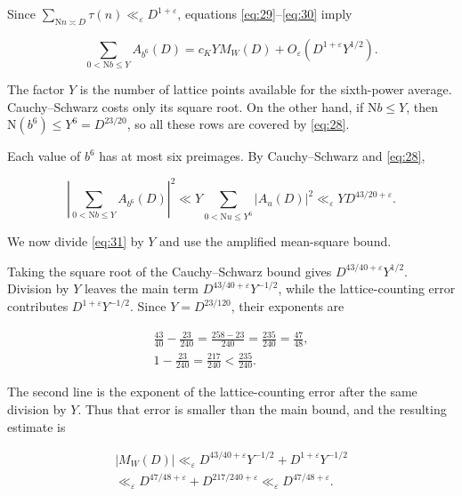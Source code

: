 \documentclass[reqno,a4paper,11pt]{amsart}
\begin{document}
Since $\sum _{\mathrm{N}n\asymp D} \tau \left( n\right) {\ll }_{\varepsilon }{D}^{1+\varepsilon }$, equations \eqref{eq:29}--\eqref{eq:30} imply

\begin{equation}\label{eq:31}
\sum _{0<\mathrm{N}b\le Y} {A}_{{b}^{6}}\left( D\right) ={c}_{K}Y{M}_{W}\left( D\right) +{O}_{\varepsilon }\left( {D}^{1+\varepsilon }{Y}^{1/2}\right) .
\end{equation}

The factor $Y$ is the number of lattice points available for the sixth-power average. Cauchy--Schwarz costs only its square root. On the other hand, if $\mathrm{N}b\le Y$, then $\mathrm{N}(b^6)\le Y^6=D^{23/20}$, so all these rows are covered by \eqref{eq:28}.

Each value of ${b}^{6}$ has at most six preimages. By Cauchy--Schwarz and \eqref{eq:28},

\[
{\left| \sum _{0<\mathrm{N}b\le Y} {A}_{{b}^{6}}\left( D\right) \right| }^{2}\ll Y\sum _{0<\mathrm{N}u\le {Y}^{6}} {\left| {A}_{u}\left( D\right) \right| }^{2}{\ll }_{\varepsilon }Y{D}^{43/20+\varepsilon }.
\]

We now divide \eqref{eq:31} by $Y$ and use the amplified mean-square bound.

Taking the square root of the Cauchy--Schwarz bound gives $D^{43/40+\varepsilon}Y^{1/2}$. Division by $Y$ leaves the main term $D^{43/40+\varepsilon}Y^{-1/2}$, while the lattice-counting error contributes $D^{1+\varepsilon}Y^{-1/2}$. Since $Y=D^{23/120}$, their exponents are

\begin{equation}\label{eq:exponent-account}
\begin{gathered}
\frac{43}{40}-\frac{23}{240}=\frac{258-23}{240}=\frac{235}{240}=\frac{47}{48}, \\ 1-\frac{23}{240}=\frac{217}{240}<\frac{235}{240}.
\end{gathered}
\end{equation}

The second line is the exponent of the lattice-counting error after the same division by $Y$. Thus that error is smaller than the main bound, and the resulting estimate is

\begin{equation}\label{eq:32}
\begin{gathered} \left| {M}_{W}\left( D\right) \right| {\ll }_{\varepsilon }{D}^{43/40+\varepsilon }{Y}^{-1/2}+{D}^{1+\varepsilon }{Y}^{-1/2} \\ {\ll }_{\varepsilon }{D}^{47/48+\varepsilon }+{D}^{217/240+\varepsilon }{\ll }_{\varepsilon }{D}^{47/48+\varepsilon }. \end{gathered}
\end{equation}
\end{document}

